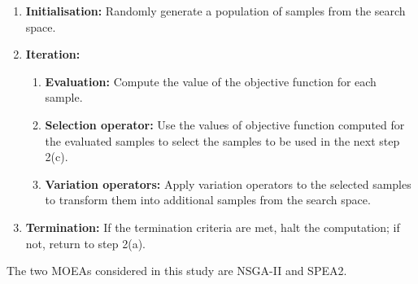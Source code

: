 \documentclass[sigconf, nonacm, preprint]{acmart}
\begin{document}
\begin{enumerate}
    \item \textbf{Initialisation:} Randomly generate a population of samples from the search space.
    \item \textbf{Iteration:}
    \begin{enumerate}
        \item \textbf{Evaluation:} Compute the value of the objective function for each sample.
        \item \textbf{Selection operator:} Use the values of objective function computed for the evaluated samples to select the samples to be used in the next step 2(c).
        \item \textbf{Variation operators:} Apply variation operators to the selected samples to transform them into additional samples from the search space.
    \end{enumerate}
    \item \textbf{Termination:} If the termination criteria are met, halt the computation; if not, return to step 2(a).
\end{enumerate}
The two MOEAs considered in this study are NSGA-II and SPEA2.
\end{document}

